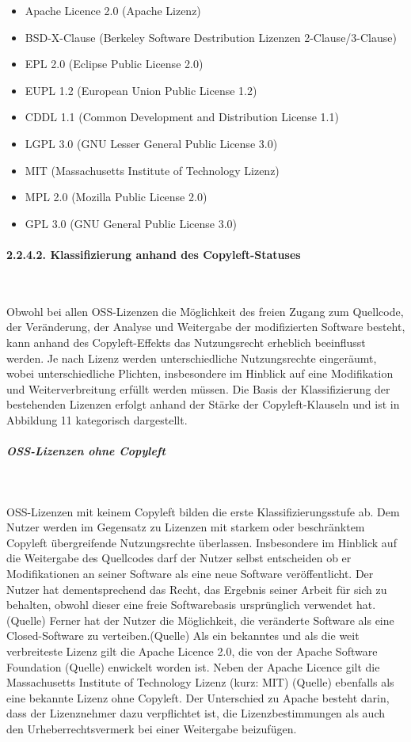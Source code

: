 \begin{itemize}
    \item Apache Licence 2.0 (Apache Lizenz)
    \item BSD-X-Clause (Berkeley Software Destribution Lizenzen 2-Clause/3-Clause)
    \item EPL 2.0 (Eclipse Public License 2.0)
    \item EUPL 1.2 (European Union Public License 1.2)
    \item CDDL 1.1 (Common Development and Distribution License 1.1)
    \item LGPL 3.0 (GNU Lesser General Public License 3.0)
    \item MIT (Massachusetts Institute of Technology Lizenz)
    \item MPL 2.0 (Mozilla Public License 2.0)
    \item GPL 3.0 (GNU General Public License 3.0)
\end{itemize}

\paragraph{2.2.4.2. Klassifizierung anhand des Copyleft-Statuses}$~$

Obwohl bei allen OSS-Lizenzen die Möglichkeit des freien Zugang zum Quellcode, der Veränderung, der Analyse und Weitergabe der modifizierten Software besteht, kann anhand des Copyleft-Effekts das Nutzungsrecht erheblich beeinflusst werden. Je nach Lizenz werden unterschiedliche Nutzungsrechte eingeräumt, wobei  unterschiedliche Plichten, insbesondere im Hinblick auf eine Modifikation und Weiterverbreitung erfüllt werden müssen. Die Basis der Klassifizierung der bestehenden Lizenzen erfolgt anhand der Stärke der Copyleft-Klauseln und ist in Abbildung 11 kategorisch dargestellt.

\subparagraph{OSS-Lizenzen ohne Copyleft}$~$

OSS-Lizenzen mit keinem Copyleft bilden die erste Klassifizierungsstufe ab. Dem Nutzer werden im Gegensatz zu Lizenzen mit starkem oder beschränktem Copyleft übergreifende Nutzungsrechte überlassen. Insbesondere im Hinblick auf die Weitergabe des Quellcodes darf der Nutzer selbst entscheiden ob er  Modifikationen an seiner Software als eine neue Software veröffentlicht. Der Nutzer hat dementsprechend das Recht, das Ergebnis seiner Arbeit für sich zu behalten, obwohl dieser eine freie Softwarebasis ursprünglich verwendet hat. (Quelle) Ferner hat der Nutzer die Möglichkeit, die veränderte Software als eine Closed-Software zu verteiben.(Quelle) Als ein bekanntes und als die weit verbreiteste Lizenz gilt die Apache Licence 2.0, die von der Apache Software Foundation (Quelle) enwickelt worden ist. Neben der Apache Licence gilt die Massachusetts Institute of Technology Lizenz (kurz: MIT) (Quelle) ebenfalls als eine bekannte Lizenz ohne Copyleft. Der Unterschied zu Apache besteht darin, dass der Lizenznehmer dazu verpflichtet ist, die Lizenzbestimmungen als auch den Urheberrechtsvermerk bei einer Weitergabe beizufügen. 

